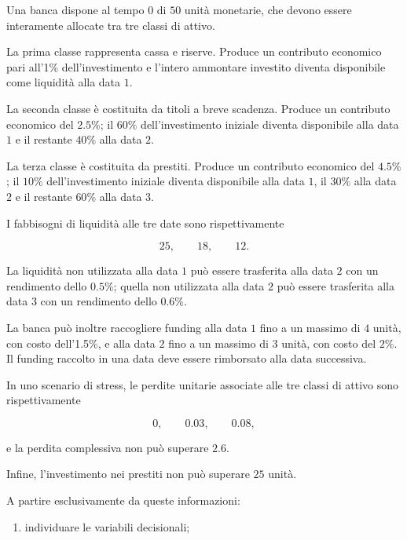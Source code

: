 \begin{exercise}

\label{ex:cap12-formulazione-alm-solver}

Una banca dispone al tempo $0$ di $50$ unit\`a monetarie, che devono essere
interamente allocate tra tre classi di attivo.

La prima classe rappresenta cassa e riserve. Produce un contributo economico
pari all'1\% dell'investimento e l'intero ammontare investito diventa
disponibile come liquidit\`a alla data $1$.

La seconda classe \`e costituita da titoli a breve scadenza. Produce un
contributo economico del $2.5\%$; il $60\%$ dell'investimento iniziale diventa
disponibile alla data $1$ e il restante $40\%$ alla data $2$.

La terza classe \`e costituita da prestiti. Produce un contributo economico
del $4.5\%$; il $10\%$ dell'investimento iniziale diventa disponibile alla
data $1$, il $30\%$ alla data $2$ e il restante $60\%$ alla data $3$.

I fabbisogni di liquidit\`a alle tre date sono rispettivamente

\[
25,\qquad18,\qquad12.
\]

La liquidit\`a non utilizzata alla data $1$ pu\`o essere trasferita alla data
$2$ con un rendimento dello $0.5\%$; quella non utilizzata alla data $2$ pu\`o
essere trasferita alla data $3$ con un rendimento dello $0.6\%$.

La banca pu\`o inoltre raccogliere funding alla data $1$ fino a un massimo di
$4$ unit\`a, con costo dell'1.5\%, e alla data $2$ fino a un massimo di $3$
unit\`a, con costo del $2\%$. Il funding raccolto in una data deve essere
rimborsato alla data successiva.

In uno scenario di stress, le perdite unitarie associate alle tre classi di
attivo sono rispettivamente

\[
0,\qquad0.03,\qquad0.08,
\]

e la perdita complessiva non pu\`o superare $2.6$.

Infine, l'investimento nei prestiti non pu\`o superare $25$ unit\`a.

A partire esclusivamente da queste informazioni:

\begin{enumerate}

\item individuare le variabili decisionali;


\end{enumerate}
\end{exercise}
